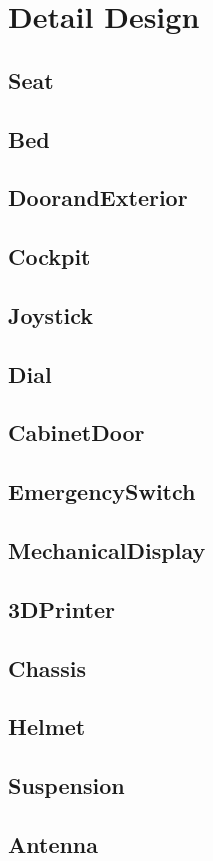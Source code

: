

\chapter{Detail Design}
\newcommand{\DetailDesign}[1]{
\section{#1}

}

\newcommand{\DetailDesignDrawing}[2]{
\begin{figure}[!ht]
    \centering
    \texttt{[image: \#1]}
    \caption{#2}
\end{figure}
}

\DetailDesign{Seat}
\clearpage
\DetailDesign{Bed}
\clearpage
\DetailDesign{DoorandExterior}
\clearpage
\DetailDesign{Cockpit}
\clearpage
\DetailDesign{Joystick}
\clearpage
\DetailDesign{Dial}
\clearpage
\DetailDesign{CabinetDoor}
\clearpage
\DetailDesign{EmergencySwitch}
\clearpage
\DetailDesign{MechanicalDisplay}
\clearpage
\DetailDesign{3DPrinter}
\clearpage
\DetailDesign{Chassis}
\clearpage
\DetailDesign{Helmet}
\clearpage
\DetailDesign{Suspension}
\clearpage
\DetailDesign{Antenna}
